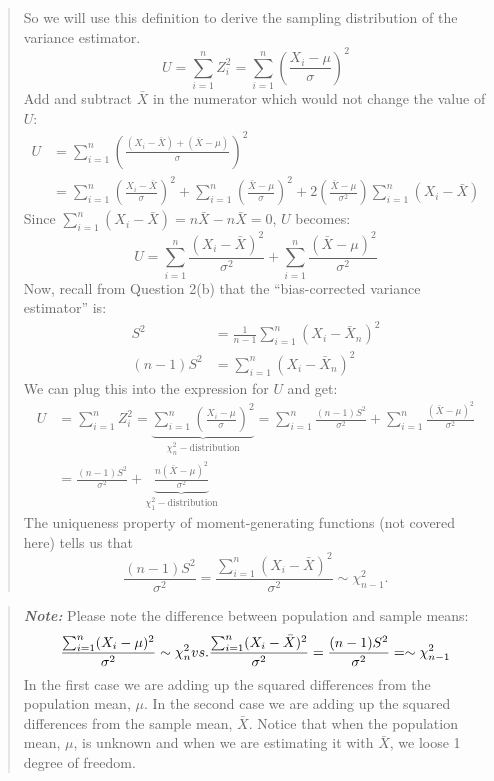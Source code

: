 \documentclass[
]{article}
\begin{document}
\begin{quote}
So we will use this definition to derive the sampling distribution of
the variance estimator. \[
U = \displaystyle\sum_{i=1}^nZ_i^2 = \displaystyle\sum_{i=1}^n\left(\frac{X_i-\mu}{\sigma}\right)^2
\] Add and subtract \(\bar{X}\) in the numerator which would not change
the value of \(U\): \[
\begin{align*}
U &=\displaystyle\sum_{i=1}^n\left(\frac{(X_i-\bar{X})+(\bar{X}-\mu)}{\sigma}\right)^2 \\[4pt]
&=\displaystyle\sum_{i=1}^n\left(\frac{X_i-\bar{X}}{\sigma}\right)^2+\displaystyle\sum_{i=1}^n\left(\frac{\bar{X}-\mu}{\sigma}\right)^2 + 2\left(\frac{\bar{X}-\mu}{\sigma^2}\right)\displaystyle\sum_{i=1}^n(X_i-\bar{X})
\end{align*}
\] Since \(\sum_{i=1}^n(X_i-\bar{X}) = n\bar{X}-n\bar{X} = 0\), \(U\)
becomes: \[
U = \displaystyle\sum_{i=1}^n\frac{(X_i-\bar{X})^2}{\sigma^2}+\displaystyle\sum_{i=1}^n\frac{(\bar{X}-\mu)^2}{\sigma^2}
\] Now, recall from Question 2(b) that the ``bias-corrected variance
estimator'' is: \[
\begin{align*}
S^2 &= \frac{1}{n-1} \displaystyle\sum_{i=1}^n (X_i - \bar X_n)^2 \\[4pt]
(n-1)S^2 &= \displaystyle\sum_{i=1}^n (X_i - \bar X_n)^2
\end{align*}
\] We can plug this into the expression for \(U\) and get: \[
\begin{align*}
U &= \displaystyle\sum_{i=1}^nZ_i^2 = \underbrace{\displaystyle\sum_{i=1}^n\left(\frac{X_i-\mu}{\sigma}\right)^2}_{\chi_n^2-\text{distribution}} = \displaystyle\sum_{i=1}^n\frac{(n-1)S^2}{\sigma^2}+\displaystyle\sum_{i=1}^n\frac{(\bar{X}-\mu)^2}{\sigma^2}\\[4pt]
&=\frac{(n-1)S^2}{\sigma^2}+\underbrace{\frac{n(\bar{X}-\mu)^2}{\sigma^2}}_{\chi_1^2-\text{distribution}}
\end{align*}
\] The uniqueness property of moment-generating functions (not covered
here) tells us that \[
\frac{(n-1)S^2}{\sigma^2} = \frac{\sum_{i=1}^n(X_i-\bar{X})^2}{\sigma^2} \sim \chi_{n-1}^2.
\]
\end{quote}

\begin{quote}
\textbf{\emph{Note:}} Please note the difference between population and
sample means: \[
\frac{\sum_{i=1}^n(X_i-\mu)^2}{\sigma^2} \sim \chi_n^2 \\[8pt]
vs.\\[8pt]
\frac{\sum_{i=1}^n(X_i-\bar{X})^2}{\sigma^2} = \frac{(n-1)S^2}{\sigma^2} = \sim \chi_{n-1}^2
\] In the first case we are adding up the squared differences from the
population mean, \(\mu.\) In the second case we are adding up the
squared differences from the sample mean, \(\bar{X}.\) Notice that when
the population mean, \(\mu\), is unknown and when we are estimating it
with \(\bar{X}\), we loose 1 degree of freedom.
\end{quote}
\end{document}
